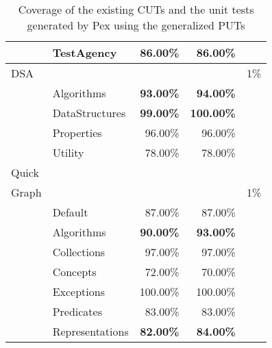 \begin{table}[t]
\begin{tabular}{|l|l|r|r|c|}
						& TestAgency 							&  86.00\%					&  86.00\%					& 		\\ \cline{2-4}
\hline
\hline
DSA 				& \multicolumn{3}{|c|}{} 																					& 1\% \\ \hline
						& Algorithms							& \textbf{93.00\%}	&  \textbf{94.00\%}	& 		\\ \cline{2-4}
						& DataStructures					& \textbf{99.00\%}	& \textbf{100.00\%}	&			\\ \cline{2-4}
						& Properties							& 96.00\%						&  96.00\%					& 		\\ \cline{2-4}
						& Utility 								& 78.00\% 					&  78.00\%					&			\\ \cline{2-4}
\hline
\hline
Quick				& \multicolumn{3}{|c|}{} 														  						&			\\ 
Graph				& \multicolumn{3}{|c|}{} 																					&	1\%	\\ \hline
						& Default									& 87.00\%						&  87.00\%					& 		\\ \cline{2-4}
						& Algorithms							& \textbf{90.00\%}	&  \textbf{93.00\%}	&			\\ \cline{2-4}
						& Collections							& 97.00\%						&  97.00\%					& 		\\ \cline{2-4}
						& Concepts 								& 72.00\% 					&  70.00\%					&			\\ \cline{2-4}
						& Exceptions 							&100.00\% 					& 100.00\%					&			\\ \cline{2-4}
						& Predicates 							& 83.00\% 					&  83.00\%					&			\\ \cline{2-4}
						& Representations					& \textbf{82.00\%}	&  \textbf{84.00\%} &			\\ \cline{2-4}
\hline
\hline
\end{tabular}
\caption{Coverage of the existing CUTs and the unit tests generated by Pex using the generalized PUTs} \vspace*{-2ex}
\label{tab:coverage}
\end{table}

